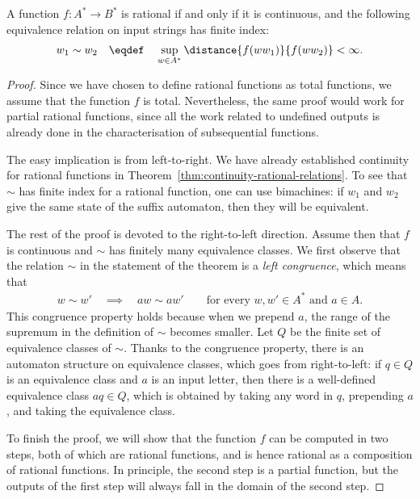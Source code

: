 \begin{theorem}\label{thm:machine-independent-rational-functions}
    A function $f : A^* \to B^*$ is rational if and only if it is continuous, and the following equivalence relation on input strings has finite index:
    \begin{align*}
w_1 \sim w_2 \quad \eqdef \quad  \sup_{w \in A^*} \distance{f(w w_1)}{f(w w_2)} < \infty.
\end{align*}
\end{theorem}
\begin{proof}
    Since we have chosen to define rational functions as total functions, we assume that the function $f$ is total. Nevertheless, the same proof would work for partial rational functions, since all  the work related to undefined outputs is already done in the characterisation of subsequential functions.


    The easy implication is from left-to-right. We have already established continuity for rational functions in Theorem~\ref{thm:continuity-rational-relations}. To see that $\sim$ has finite index for a rational function, one can use bimachines: if $w_1$ and $w_2$ give the same state of the suffix automaton, then they will be equivalent. 
    
    The rest of the proof is devoted to the right-to-left direction. Assume then that $f$ is continuous and $\sim$ has finitely many equivalence classes. 
    We first observe that the relation  $\sim$ in the statement of the theorem  is a \emph{left congruence}, which means that 
\begin{align*}
w \sim w' \quad \implies \quad aw \sim aw' \qquad \text{for every $w,w' \in A^*$ and $a \in A$}.
\end{align*}
This congruence property holds because when we prepend $a$, the range of the supremum in the definition of $\sim$ becomes smaller. 
Let $Q$ be the finite set of equivalence classes of $\sim$.  Thanks to the congruence property, there is an automaton structure on equivalence classes, which goes from right-to-left: if $q \in Q$ is an equivalence class and $a$ is an input letter, then there is a well-defined equivalence class $aq \in Q$, which is obtained by taking any word in $q$, prepending $a$, and taking the equivalence class.

To finish the proof, we will show that the function $f$ can be computed in two steps, both of which are rational functions, and is hence rational as a composition of rational functions. In principle, the second step is a partial function, but the outputs of the first step will always fall in the domain of the second step.


\end{proof}
